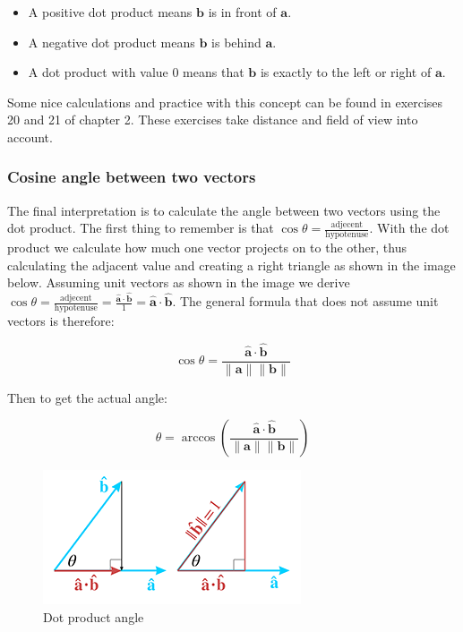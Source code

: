 \documentclass[11pt]{article}
\begin{document}
\begin{itemize}
	\item A positive dot product means $\textbf{b}$ is in front of $\textbf{a}$.
	\item A negative dot product means $\textbf{b}$ is behind $\textbf{a}$.
	\item A dot product with value 0 means that $\textbf{b}$ is exactly to the left or right of $\textbf{a}$.
\end{itemize}

Some nice calculations and practice with this concept can be found in exercises 20 and 21 of chapter 2. These exercises take distance and field of view into account.

\subsubsection{Cosine angle between two vectors}

The final interpretation is to calculate the angle between two vectors using the dot product. The first thing to remember is that $\cos\theta=\frac{\text{adjecent}}{\text{hypotenuse}}$. With the dot product we calculate how much one vector projects on to the other, thus calculating the adjacent value and creating a right triangle as shown in the image below. Assuming unit vectors as shown in the image we derive $\cos\theta=\frac{\text{adjecent}}{\text{hypotenuse}}=\frac{\hat{\textbf{a}}\cdot\hat{\textbf{b}}}{1}=\hat{\textbf{a}}\cdot\hat{\textbf{b}}$. The general formula that does not assume unit vectors is therefore:

$$\cos\theta=\frac{\hat{\textbf{a}}\cdot\hat{\textbf{b}}}{\|\textbf{a}\|\|\textbf{b}\|}$$

Then to get the actual angle:

$$\theta=\arccos\left(\frac{\hat{\textbf{a}}\cdot\hat{\textbf{b}}}{\|\textbf{a}\|\|\textbf{b}\|}\right)$$

\begin{figure}[H]
\centering
    \includegraphics{02_dot_angle}
\caption{Dot product angle}
\label{fig:dot-product-angle}
\end{figure}
\end{document}
